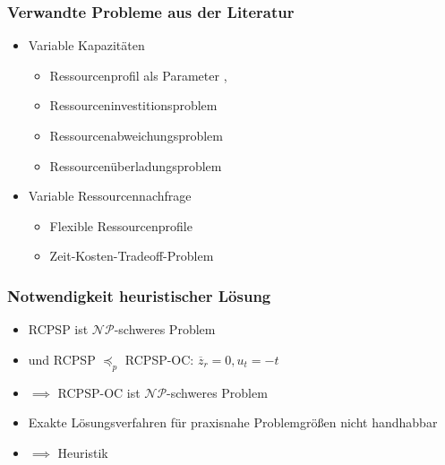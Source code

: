 
\begin{frame}[noframenumbering]
\frametitle{Verwandte Probleme aus der Literatur}
\begin{itemize}
\item Variable Kapazitäten
\begin{itemize}
\item Ressourcenprofil als Parameter {\footnotesize \cite{Klein2000}, \cite{Hartmann2012}}
\item Ressourceninvestitionsproblem {\footnotesize \cite{Mohring1984}}
\item Ressourcenabweichungsproblem {\footnotesize \cite{Neumann2003}} 
\item Ressourcenüberladungsproblem {\footnotesize \cite{Neumann2003}}
\end{itemize}
\vspace*{4mm}
\item Variable Ressourcennachfrage
\begin{itemize}
\item Flexible Ressourcenprofile {\footnotesize \cite{Ranjbar2010}}
\item Zeit-Kosten-Tradeoff-Problem {\footnotesize \cite{Demeulemeester1996}}
\end{itemize}
\end{itemize}

\end{frame}



\begin{frame}[noframenumbering]
	\frametitle{Notwendigkeit heuristischer Lösung}
	\begin{itemize}
		\item RCPSP ist $\mathcal{NP}$-schweres Problem
		\item und RCPSP $\preceq_p$ RCPSP-OC: $\overline{z}_{r}=0, u_t=-t$
		\item[] $\implies$ RCPSP-OC ist $\mathcal{NP}$-schweres Problem\\[10mm]
		\item Exakte Lösungsverfahren für praxisnahe Problemgrößen nicht handhabbar
		\item[] $\implies$ Heuristik
	\end{itemize}
\end{frame}

